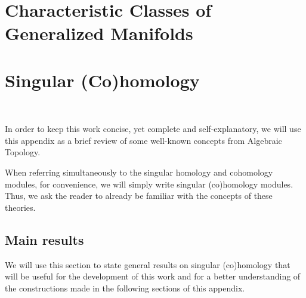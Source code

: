 \documentclass[12pt,oneside]{book}
\begin{document}
    \chapter{Characteristic Classes of Generalized Manifolds}\label{cap_wu_gen}
    \thispagestyle{empty}



    \appendix

    \chapter{Singular (Co)homology}\label{ap_(co)_sing}
    \thispagestyle{empty}

    \

    In order to keep this work concise, yet complete and self-explanatory, we will use this appendix as 
    a brief review of some well-known concepts from Algebraic Topology.

    When referring simultaneously to the singular homology and cohomology modules, for convenience, we 
    will simply write singular (co)homology modules. Thus, we ask the 
    reader to already be familiar with the concepts of these theories.
    
    \section{Main results}\label{ap_principais_res}
    
    We will use this section to state general results on singular (co)homology that will be useful for 
    the development of this work and for a better understanding of the constructions made in the 
    following sections of this appendix.
    
\end{document}

